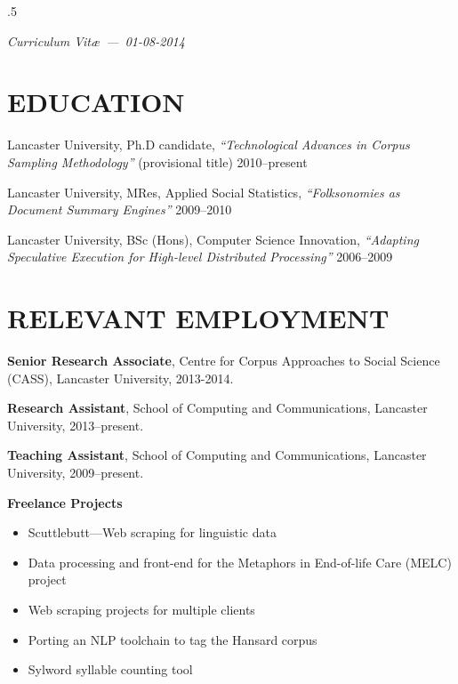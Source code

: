 \documentclass{res}
\begin{document}
 
\thispagestyle{empty} %
\address{\\
\texttt{<steve@stephenwattam.com>}\\
\texttt{http://stephenwattam.com/}}


\begin{resume}
\vspace{0.2in}
\moveleft.5\sectionwidth\centerline{\it Curriculum Vit\ae~---~01-08-2014}  

\section{EDUCATION}
\vspace{0.1in} 
 
    Lancaster University, Ph.D candidate,
    \textit{``Technological Advances in Corpus Sampling Methodology''} (provisional title)
    2010--present

    Lancaster University, MRes,
    Applied Social Statistics, 
    \textit{``Folksonomies as Document Summary Engines''}
    2009--2010

    Lancaster University, BSc (Hons),
    Computer Science Innovation, 
    \textit{``Adapting Speculative Execution for High-level Distributed Processing''}
    2006--2009



\section{RELEVANT EMPLOYMENT} 
\vspace{0.1in} 

    {\bf Senior Research Associate},
    Centre for Corpus Approaches to Social Science (CASS),
    Lancaster University,
    2013-2014.

    {\bf Research Assistant}, 
    School of Computing and Communications, 
    Lancaster University, 
    2013--present.

    {\bf Teaching Assistant}, 
    School of Computing and Communications, 
    Lancaster University, 
    2009--present.

    {\bf Freelance Projects} 
    \begin{itemize}
        \item Scuttlebutt---Web scraping for linguistic data
        \item Data processing and front-end for the Metaphors in End-of-life Care (MELC) project
        \item Web scraping projects for multiple clients
        \item Porting an NLP toolchain to tag the Hansard corpus
        \item Sylword syllable counting tool
    \end{itemize}
    

\end{resume}
\end{document}
